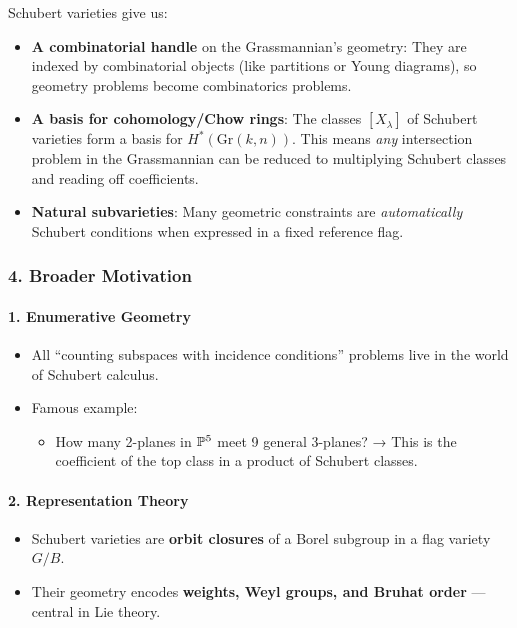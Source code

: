\documentclass{amsart}
\let\originalmathbb\mathbb
\renewcommand{\mathbb}[1]{%
    \ifstrequal{#1}{1}{\mathbbm{#1}}{\originalmathbb{#1}}%
}
\theoremstyle{plain}
\theoremstyle{definition}
\theoremstyle{remark}
\begin{document}
Schubert varieties give us:

\begin{itemize}
	\item \textbf{A combinatorial handle} on the Grassmannian’s geometry:
They are indexed by combinatorial objects (like partitions or Young diagrams), so geometry problems become combinatorics problems.
	\item \textbf{A basis for cohomology/Chow rings}:
The classes $[X_\lambda]$ of Schubert varieties form a basis for $H^*(\mathrm{Gr}(k,n))$. This means \textit{any} intersection problem in the Grassmannian can be reduced to multiplying Schubert classes and reading off coefficients.
	\item \textbf{Natural subvarieties}:
Many geometric constraints are \textit{automatically} Schubert conditions when expressed in a fixed reference flag.
\end{itemize}

\subsubsection{4. \textbf{Broader Motivation}}

\paragraph{1. \textbf{Enumerative Geometry}}

\begin{itemize}
	\item All “counting subspaces with incidence conditions” problems live in the world of Schubert calculus.
	\item Famous example:
	\begin{itemize}
		\item How many 2-planes in $\mathbb{P}^5$ meet 9 general 3-planes?
→ This is the coefficient of the top class in a product of Schubert classes.
	\end{itemize}
\end{itemize}

\paragraph{2. \textbf{Representation Theory}}

\begin{itemize}
	\item Schubert varieties are \textbf{orbit closures} of a Borel subgroup in a flag variety $G/B$.
	\item Their geometry encodes \textbf{weights, Weyl groups, and Bruhat order} — central in Lie theory.
\end{itemize}
\end{document}
